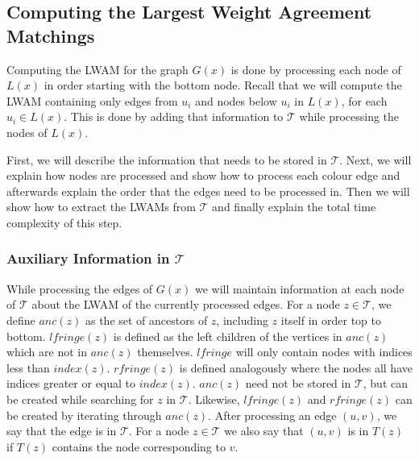 \subsection{Computing the Largest Weight Agreement Matchings}
Computing the LWAM for the graph $G(x)$ is done by processing each node of $L(x)$ in order starting with the bottom node. Recall that we will compute the LWAM containing only edges from $u_i$ and nodes below $u_i$ in $L(x)$, for each $u_i \in L(x)$. This is done by adding that information to $\mathcal{T}$ while processing the nodes of $L(x)$. 

First, we will describe the information that needs to be stored in $\mathcal{T}$. Next, we will explain how nodes are processed and show how to process each colour edge and afterwards explain the order that the edges need to be processed in. Then we will show how to extract the LWAMs from $\mathcal{T}$ and finally explain the total time complexity of this step.

\subsubsection{Auxiliary Information in $\mathcal{T}$}
While processing the edges of $G(x)$ we will maintain information at each node of $\mathcal{T}$ about the LWAM of the currently processed edges. For a node $z \in \mathcal{T}$, we define $anc(z)$ as the set of ancestors of $z$, including $z$ itself in order top to bottom. $lfringe(z)$ is defined as the left children of the vertices in $anc(z)$ which are not in $anc(z)$ themselves. $lfringe$ will only contain nodes with indices less than $index(z)$. $rfringe(z)$ is defined analogously where the nodes all have indices greater or equal to $index(z)$. $anc(z)$ need not be stored in $\mathcal{T}$, but can be created while searching for $z$ in $\mathcal{T}$. Likewise, $lfringe(z)$ and $rfringe(z)$ can be created by iterating through $anc(z)$. After processing an edge $(u,v)$, we say that the edge is in $\mathcal{T}$. For a node $z \in \mathcal{T}$ we also say that $(u,v)$ is in $T(z)$ if $T(z)$ contains the node corresponding to $v$.

